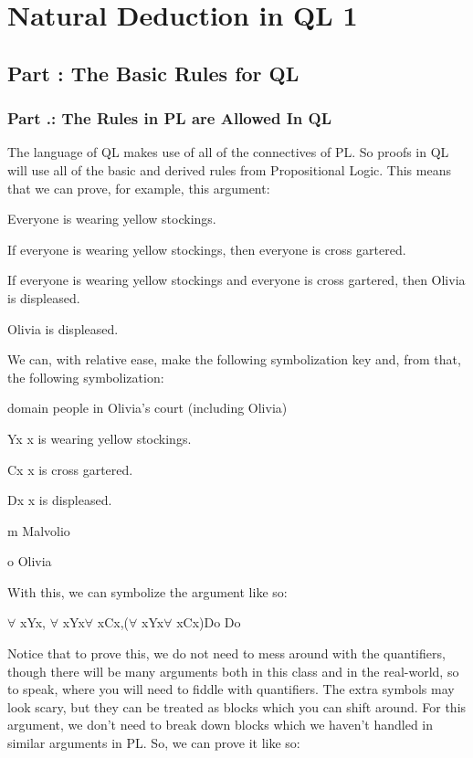 \part{Natural Deduction in QL 1}
\label{ch.qlnd1}
\setcounter{seccount}{1}
\chapter{Part \thechapcount: The Basic Rules for QL}
\section{Part \thechapcount.\theseccount: The Rules in PL are Allowed In QL}
The language of QL makes use of all of the connectives of PL. So proofs in QL will use all of the basic and derived rules from Propositional Logic. This means that we can prove, for example, this argument:
\begin{earg}
\item[]Everyone is wearing yellow stockings.
\item[]If everyone is wearing yellow stockings, then everyone is cross gartered.
\item[]If everyone is wearing yellow stockings and everyone is cross gartered, then Olivia is displeased.
\item[\therefore] Olivia is displeased.
\end{earg}
We can, with relative ease, make the following symbolization key and, from that, the following symbolization:
\begin{ekey}
\item[domain] people in Olivia's court (including Olivia)
\item[Yx] x is wearing yellow stockings.
\item[Cx] x is cross gartered.
\item[Dx] x is displeased.
\item[m] Malvolio
\item[o] Olivia
\end{ekey}
With this, we can symbolize the argument like so:
\begin{center}
$\forall$ xYx, $\forall$ xYx\eif $\forall$ xCx,($\forall$ xYx\eand $\forall$ xCx)\eif Do \therefore Do
\end{center}
Notice that to prove this, we do not need to mess around with the quantifiers, though there will be many arguments both in this class and in the real-world, so to speak, where you will need to fiddle with quantifiers. The extra symbols may look scary, but they can be treated as blocks which you can shift around. For this argument, we don't need to break down blocks which we haven't handled in similar arguments in PL. So, we can prove it like so:
\begin{fitchproof}
\end{fitchproof}	

